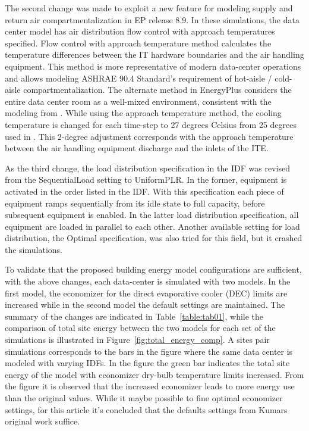 The second change was made to exploit a new feature for modeling supply and return air compartmentalization in EP release 8.9. In these simulations, the data center model has air distribution flow control with approach temperatures specified. Flow control with approach temperature method calculates the temperature differences between the IT hardware boundaries and the air handling equipment.  This method is more representative of modern data-center operations and allows modeling ASHRAE 90.4 Standard’s requirement of hot-aisle / cold-aisle compartmentalization. The alternate method in EnergyPlus considers the entire data center room as a well-mixed environment, consistent with the modeling from \cite{kumar20}. While using the approach temperature method, the cooling temperature is changed for each time-step to 27 degrees Celsius from 25 degrees used in \cite{kumar20}. This 2-degree adjustment corresponds with the approach temperature between the air handling equipment discharge and the inlets of the ITE. 

As the third change, the load distribution specification in the IDF was revised from the SequentialLoad setting to UniformPLR. In the former, equipment is activated in the order listed in the IDF. With this specification each piece of equipment ramps sequentially from its idle state to full capacity, before subsequent equipment is enabled. In the latter load distribution specification, all equipment are loaded in parallel to each other. Another available setting for load distribution, the Optimal specification, was also tried for this field, but it crashed the simulations.

To validate that the proposed building energy model configurations are sufficient, with the above changes, each data-center is simulated with two models. In the first model, the economizer for the direct evaporative cooler (DEC) limits are increased while in the second model the default settings are maintained. The summary of the changes are indicated in Table~\ref{table:tab01}, while the comparison of total site energy between the two models for each set of the simulations is illustrated in Figure~\ref{fig:total_energy_comp}. A site\textsc{}s pair simulations corresponds to the bars in the figure where the same data center is modeled with varying IDFs. In the figure the green bar indicates the total site energy of the model with economizer dry-bulb temperature limits increased. From the figure it is observed that the increased economizer leads to more energy use than the original values. While it maybe possible to fine optimal economizer settings, for this article it's concluded that the defaults settings from Kumar\textsc{}s original work suffice. 

